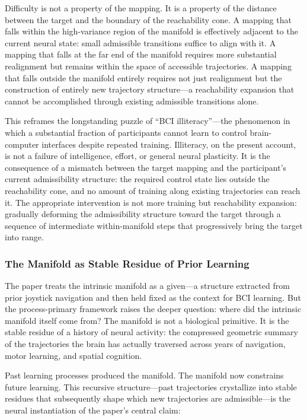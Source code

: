 \documentclass[12pt, a4paper]{article}
\theoremstyle{plain}
\theoremstyle{definition}
\theoremstyle{remark}
\begin{document}
Difficulty is not a property of the mapping. It is a property of the
distance between the target and the boundary of the reachability cone.
A mapping that falls within the high-variance region of the manifold
is effectively adjacent to the current neural state: small admissible
transitions suffice to align with it. A mapping that falls at the
far end of the manifold requires more substantial realignment but remains
within the space of accessible trajectories. A mapping that falls outside
the manifold entirely requires not just realignment but the construction
of entirely new trajectory structure---a reachability expansion that
cannot be accomplished through existing admissible transitions alone.

This reframes the longstanding puzzle of ``BCI illiteracy''---the
phenomenon in which a substantial fraction of participants cannot learn
to control brain-computer interfaces despite repeated training. Illiteracy,
on the present account, is not a failure of intelligence, effort, or
general neural plasticity. It is the consequence of a mismatch between
the target mapping and the participant's current admissibility structure:
the required control state lies outside the reachability cone, and no
amount of training along existing trajectories can reach it. The
appropriate intervention is not more training but reachability expansion:
gradually deforming the admissibility structure toward the target through
a sequence of intermediate within-manifold steps that progressively bring
the target into range.

\subsubsection*{The Manifold as Stable Residue of Prior Learning}

The paper treats the intrinsic manifold as a given---a structure extracted
from prior joystick navigation and then held fixed as the context for
BCI learning. But the process-primary framework raises the deeper question:
where did the intrinsic manifold itself come from? The manifold is not
a biological primitive. It is the stable residue of a history of neural
activity: the compressed geometric summary of the trajectories the brain
has actually traversed across years of navigation, motor learning, and
spatial cognition.

Past learning processes produced the manifold. The manifold now constrains
future learning. This recursive structure---past trajectories crystallize
into stable residues that subsequently shape which new trajectories are
admissible---is the neural instantiation of the paper's central claim:
\end{document}
